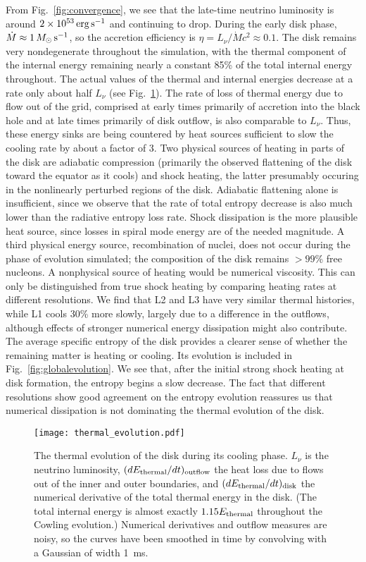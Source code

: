 From Fig.~\ref{fig:convergence}, we see that the late-time
neutrino luminosity is around $2\times 10^{53}\rm\,erg\,s^{-1}$
and continuing to drop.  During the early disk phase,
$\dot{M} \approx 1\,M_{\odot}\rm\,s^{-1}$, so the
accretion efficiency is $\eta=L_{\nu}/\dot{M}c^2 \approx 0.1$. 
The disk remains very nondegenerate throughout the simulation, with
the thermal component of the internal energy remaining nearly
a constant 85\% of the total internal energy throughout.
The actual values of the thermal and internal energies
decrease at a rate only about half $L_{\nu}$ (see Fig.~\ref{fig:cooling}).
The rate of loss of thermal energy due to flow out of the grid,
comprised at early times primarily of accretion into the black hole
and at late times primarily of disk outflow, is also comparable
to $L_{\nu}$.  Thus, these energy sinks are being countered
by heat sources sufficient to slow the cooling rate by about a
factor of 3.  Two physical sources of heating in parts of the disk are
adiabatic compression (primarily the observed flattening of the disk
toward the equator as it cools) and shock heating, the latter presumably
occuring in the nonlinearly perturbed regions of the disk.  Adiabatic
flattening alone is insufficient, since we observe that the rate of
total entropy decrease is also much lower than the radiative entropy
loss rate.  Shock dissipation is the more plausible heat source, since
losses in spiral mode energy are of the needed magnitude.
A third physical energy source, recombination of nuclei, does not occur
during the phase of evolution simulated;
the composition of the disk remains $>99$\% free nucleons. 
A nonphysical source of heating would be numerical viscosity. 
This can only be distinguished from true shock heating by
comparing heating rates at different resolutions.  We find that
L2 and L3 have very similar thermal histories, while L1
cools 30\% more slowly, largely due to a difference in the outflows,
although effects of stronger numerical energy dissipation might
also contribute.  The average specific
entropy of the disk provides a clearer sense of whether the remaining
matter is heating or cooling.  Its evolution is included in
Fig.~\ref{fig:globalevolution}.  We see that, after the initial
strong shock heating at disk formation, the entropy begins a slow
decrease.  The fact that different resolutions show good agreement
on the entropy evolution reassures us that numerical dissipation
is not dominating the thermal evolution of the disk.

\begin{figure}
\texttt{[image: thermal\_evolution.pdf]}
\caption{
The thermal evolution of the disk during its cooling phase. 
$L_{\nu}$ is the neutrino luminosity, $(dE_{\rm thermal}/dt)_{\rm outflow}$
the heat loss due to flows out of the inner and outer boundaries,
and $(dE_{\rm thermal}/dt)_{\rm disk}$ the numerical derivative of the
total thermal energy in the disk.  (The total internal energy
is almost exactly $1.15E_{\rm thermal}$ throughout the Cowling evolution.) 
Numerical derivatives and
outflow measures are noisy, so the curves have been smoothed in
time by convolving with a Gaussian of width 1~ms.
}
\label{fig:cooling}
\end{figure}

